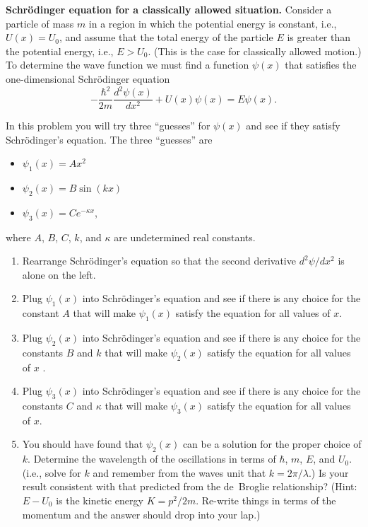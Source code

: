 \begin{problem}
{\bf Schr\"{o}dinger equation for a classically allowed situation.}
Consider a particle of mass $m$ in a region in which the potential energy
is constant, i.e., $U(x)=U_0$, and assume that the total energy of
the particle $E$ is greater than the potential energy, i.e., $E>U_0$.
(This is the case for classically allowed motion.)  To determine
the wave function we must find a function $\psi(x)$  that satisfies
the one-dimensional Schr\"{o}dinger equation \[ -\frac{\hbar^2}{2m}
\frac{d^2\psi(x)}{dx^2} + U(x)\psi(x) = E\psi(x).  \]

In this problem you will try three ``guesses'' for $\psi(x)$ 
and see if they satisfy Schr\"{o}dinger's equation. The 
three ``guesses'' are
\begin{itemize}
\item $\psi_1(x) = Ax^2$ 
\item $\psi_2(x) = B\sin(kx)$
\item $\psi_3(x) = Ce^{-\kappa x}$,
\end{itemize}
where $A$, $B$, $C$, $k$, and $\kappa$ are undetermined real
constants.
    \begin{enumerate}
    \item Rearrange Schr\"{o}dinger's equation so that the
    second derivative $d^2\psi/dx^2$ is alone on the left.
    \item Plug $\psi_1(x)$ into Schr\"{o}dinger's equation and 
    see if there is any choice for the constant $A$ that will
    make $\psi_1(x)$ satisfy the equation for all values of $x$.
    \item Plug $\psi_2(x)$ into Schr\"{o}dinger's equation and see
    if there is any choice for the constants $B$ and $k$ that will
    make $\psi_2(x)$ satisfy the equation for all values of $x$ .  
    \item  Plug $\psi_3(x)$ into Schr\"{o}dinger's equation and see
    if there is any choice for the constants $C$ and $\kappa$ that will
    make $\psi_3(x)$ satisfy the equation for all values of $x$. 
    \item You should have found that $\psi_2(x)$ can be a solution for
    the proper choice of $k$.  Determine the wavelength of the
    oscillations in terms of $\hbar$, $m$, $E$, and $U_0$. (i.e., solve
    for $k$ and remember from the waves unit that $k=2\pi/\lambda$.)  
    Is your result consistent with that predicted from the de~Broglie 
    relationship?  (Hint: $E-U_0$ is the kinetic energy $K = p^2/2m$.  
    Re-write things in terms of the momentum and the answer should drop 
    into your lap.)
    \end{enumerate}
\label{prob:TestSchrod}
\end{problem}

